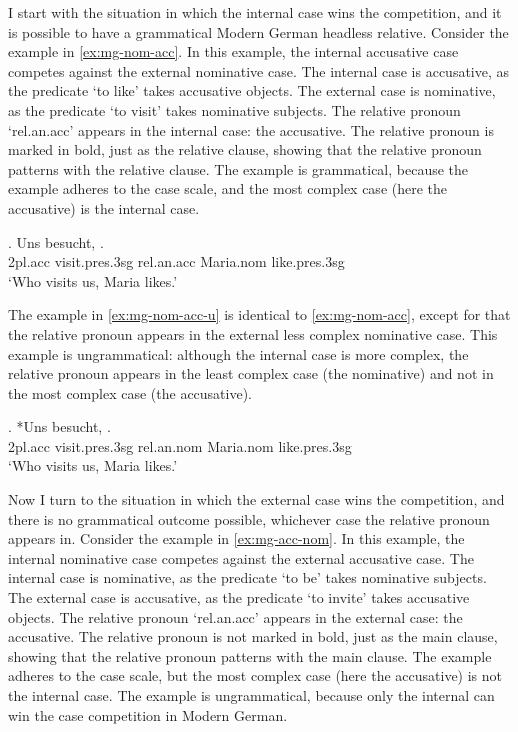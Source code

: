 I start with the situation in which the internal case wins the competition, and it is possible to have a grammatical Modern German headless relative.
Consider the example in \ref{ex:mg-nom-acc}. In this example, the internal accusative case competes against the external nominative case.
The internal case is accusative, as the predicate  `to like' takes accusative objects.
The external case is nominative, as the predicate  `to visit' takes nominative subjects.
The relative pronoun  `\ac{rel}.\ac{an}.\ac{acc}' appears in the internal case: the accusative. The relative pronoun is marked in bold, just as the relative clause, showing that the relative pronoun patterns with the relative clause.
The example is grammatical, because the example adheres to the case scale, and the most complex case (here the accusative) is the internal case.

\exg. Uns besucht,   .\\
 2\ac{pl}.\ac{acc} visit.\ac{pres}.3\ac{sg}\scsub{[nom]} \ac{rel}.\ac{an}.\ac{acc} Maria.\ac{nom} like.\ac{pres}.3\ac{sg}\scsub{[acc]}\\
 `Who visits us, Maria likes.' \label{ex:mg-nom-acc}

The example in \ref{ex:mg-nom-acc-u} is identical to \ref{ex:mg-nom-acc}, except for that the relative pronoun appears in the external less complex nominative case. This example is ungrammatical: although the internal case is more complex, the relative pronoun appears in the least complex case (the nominative) and not in the most complex case (the accusative).

\exg. *Uns besucht,   .\\
 2\ac{pl}.\ac{acc} visit.\ac{pres}.3\ac{sg}\scsub{[nom]} \ac{rel}.\ac{an}.\ac{nom} Maria.\ac{nom} like.\ac{pres}.3\ac{sg}\scsub{[acc]}\\
 `Who visits us, Maria likes.' \label{ex:mg-nom-acc-u}

Now I turn to the situation in which the external case wins the competition, and there is no grammatical outcome possible, whichever case the relative pronoun appears in.
Consider the example in \ref{ex:mg-acc-nom}. In this example, the internal nominative case competes against the external accusative case.
The internal case is nominative, as the predicate  `to be' takes nominative subjects.
The external case is accusative, as the predicate  `to invite' takes accusative objects.
The relative pronoun  `\ac{rel}.\ac{an}.\ac{acc}' appears in the external case: the accusative. The relative pronoun is not marked in bold, just as the main clause, showing that the relative pronoun patterns with the main clause.
The example adheres to the case scale, but the most complex case (here the accusative) is not the internal case. The example is ungrammatical, because only the internal can win the case competition in Modern German.

